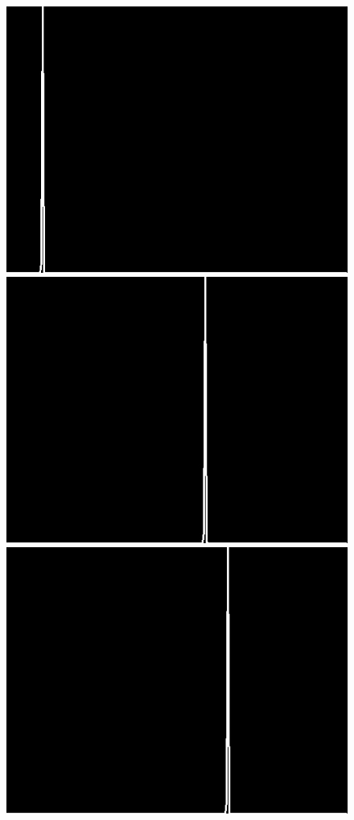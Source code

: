 \documentclass[12pt]{report}
\begin{document}
\begin{figure}[H]
\begin{center}
\includegraphics[scale=0.25]{../ImageRes/dct_masked1_histo_0.jpg} 
\includegraphics[scale=0.25]{../ImageRes/dct_masked1_histo_1.jpg} 
\includegraphics[scale=0.25]{../ImageRes/dct_masked1_histo_2.jpg} 

\end{center}
\end{figure}
\end{document}
